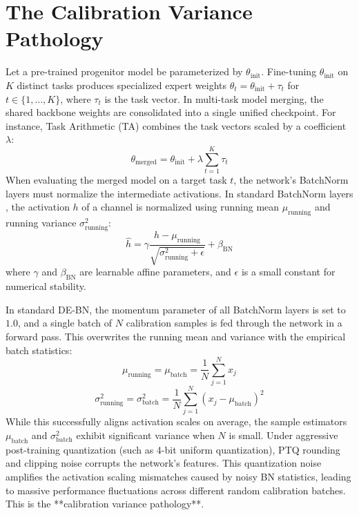\documentclass{article}
\begin{document}
\section{The Calibration Variance Pathology}
\label{submission-pathology}
Let a pre-trained progenitor model be parameterized by $\theta_{\text{init}}$. Fine-tuning $\theta_{\text{init}}$ on $K$ distinct tasks produces specialized expert weights $\theta_t = \theta_{\text{init}} + \tau_t$ for $t \in \{1, \dots, K\}$, where $\tau_t$ is the task vector. In multi-task model merging, the shared backbone weights are consolidated into a single unified checkpoint. For instance, Task Arithmetic (TA) combines the task vectors scaled by a coefficient $\lambda$:
\begin{equation}
    \theta_{\text{merged}} = \theta_{\text{init}} + \lambda \sum_{t=1}^K \tau_t
\end{equation}
When evaluating the merged model on a target task $t$, the network's BatchNorm layers must normalize the intermediate activations. In standard BatchNorm layers \cite{ioffe15}, the activation $h$ of a channel is normalized using running mean $\mu_{\text{running}}$ and running variance $\sigma^2_{\text{running}}$:
\begin{equation}
    \hat{h} = \gamma \frac{h - \mu_{\text{running}}}{\sqrt{\sigma^2_{\text{running}} + \epsilon}} + \beta_{\text{BN}}
\end{equation}
where $\gamma$ and $\beta_{\text{BN}}$ are learnable affine parameters, and $\epsilon$ is a small constant for numerical stability.

In standard DE-BN, the momentum parameter of all BatchNorm layers is set to $1.0$, and a single batch of $N$ calibration samples is fed through the network in a forward pass. This overwrites the running mean and variance with the empirical batch statistics:
\begin{equation}
    \mu_{\text{running}} = \mu_{\text{batch}} = \frac{1}{N} \sum_{j=1}^N x_j
\end{equation}
\begin{equation}
    \sigma^2_{\text{running}} = \sigma^2_{\text{batch}} = \frac{1}{N} \sum_{j=1}^N (x_j - \mu_{\text{batch}})^2
\end{equation}
While this successfully aligns activation scales on average, the sample estimators $\mu_{\text{batch}}$ and $\sigma^2_{\text{batch}}$ exhibit significant variance when $N$ is small. Under aggressive post-training quantization (such as 4-bit uniform quantization), PTQ rounding and clipping noise corrupts the network's features. This quantization noise amplifies the activation scaling mismatches caused by noisy BN statistics, leading to massive performance fluctuations across different random calibration batches. This is the **calibration variance pathology**.
\end{document}
